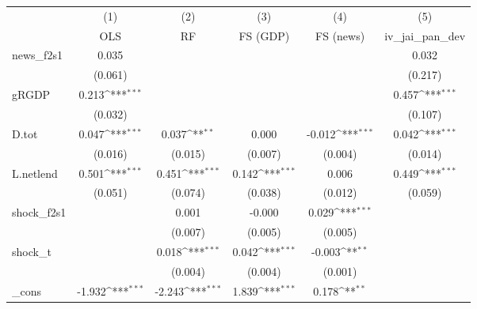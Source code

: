{
\def\sym#1{\ifmmode^{#1}\else\(^{#1}\)\fi}
\begin{tabular}{l*{5}{c}}
\toprule
            &\multicolumn{1}{c}{(1)}&\multicolumn{1}{c}{(2)}&\multicolumn{1}{c}{(3)}&\multicolumn{1}{c}{(4)}&\multicolumn{1}{c}{(5)}\\
            &\multicolumn{1}{c}{OLS}&\multicolumn{1}{c}{RF}&\multicolumn{1}{c}{FS (GDP)}&\multicolumn{1}{c}{FS (news)}&\multicolumn{1}{c}{iv\_jai\_pan\_dev}\\
\midrule
news\_f2s1   &       0.035         &                     &                     &                     &       0.032         \\
            &     (0.061)         &                     &                     &                     &     (0.217)         \\
\addlinespace
gRGDP       &       0.213\sym{***}&                     &                     &                     &       0.457\sym{***}\\
            &     (0.032)         &                     &                     &                     &     (0.107)         \\
\addlinespace
D.tot       &       0.047\sym{***}&       0.037\sym{**} &       0.000         &      -0.012\sym{***}&       0.042\sym{***}\\
            &     (0.016)         &     (0.015)         &     (0.007)         &     (0.004)         &     (0.014)         \\
\addlinespace
L.netlend   &       0.501\sym{***}&       0.451\sym{***}&       0.142\sym{***}&       0.006         &       0.449\sym{***}\\
            &     (0.051)         &     (0.074)         &     (0.038)         &     (0.012)         &     (0.059)         \\
\addlinespace
shock\_f2s1  &                     &       0.001         &      -0.000         &       0.029\sym{***}&                     \\
            &                     &     (0.007)         &     (0.005)         &     (0.005)         &                     \\
\addlinespace
shock\_t     &                     &       0.018\sym{***}&       0.042\sym{***}&      -0.003\sym{**} &                     \\
            &                     &     (0.004)         &     (0.004)         &     (0.001)         &                     \\
\addlinespace
\_cons      &      -1.932\sym{***}&      -2.243\sym{***}&       1.839\sym{***}&       0.178\sym{**} &                     \\

\end{tabular}}
